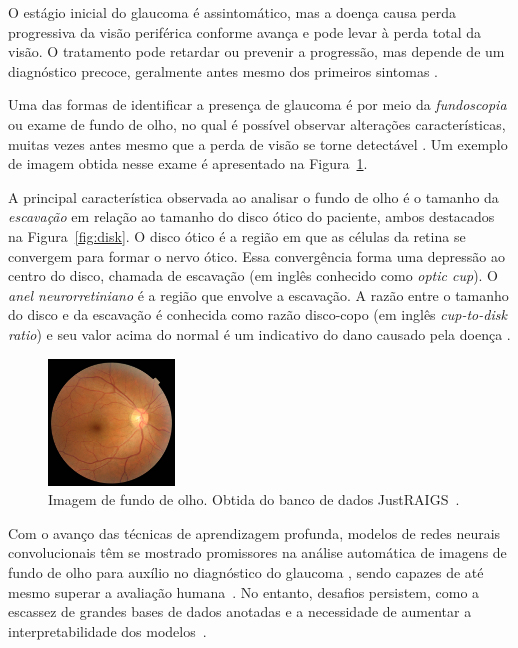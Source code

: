 \documentclass[12pt]{article}
\begin{document}
O estágio inicial do glaucoma é assintomático, mas a doença causa perda progressiva da visão periférica conforme avança e pode levar à perda total da visão. O tratamento pode retardar ou prevenir a progressão, mas depende de um diagnóstico precoce, geralmente antes mesmo dos primeiros sintomas \cite{who_2019}.

Uma das formas de identificar a presença de glaucoma é por meio da \emph{fundoscopia} ou exame de fundo de olho, no qual é possível observar alterações características, muitas vezes antes mesmo que a perda de visão se torne detectável \cite{weinreb_2004}. Um exemplo de imagem obtida nesse exame é apresentado na Figura~\ref{fig:fundus}.

A principal característica observada ao analisar o fundo de olho é o tamanho da \emph{escavação} em relação ao tamanho do disco ótico do paciente, ambos destacados na Figura~\ref{fig:disk}. O disco ótico é a região em que as células da retina se convergem para formar o nervo ótico. Essa convergência forma uma depressão ao centro do disco, chamada de escavação (em inglês conhecido como \emph{optic cup}). O \emph{anel neurorretiniano} é a região que envolve a escavação. A razão entre o tamanho do disco e da escavação é conhecida como razão disco-copo (em inglês \emph{cup-to-disk ratio}) e seu valor acima do normal é um indicativo do dano causado pela doença \cite{weinreb_2004}. %

\begin{figure}[htb]
 \centering
 \includegraphics[width=0.3\textwidth]{images/TRAIN000004_cut.JPG}
 \caption{Imagem de fundo de olho. Obtida do banco de dados JustRAIGS~\cite{justraigs}.}
 \label{fig:fundus}
\end{figure}


Com o avanço das técnicas de aprendizagem profunda, modelos de redes neurais convolucionais têm se mostrado promissores na análise automática de imagens de fundo de olho para auxílio no diagnóstico do glaucoma \cite{li_review_2021}, sendo capazes de até mesmo superar a avaliação humana~\cite{tan_glaucoma_2020}. No entanto, desafios persistem, como a escassez de grandes bases de dados anotadas e a necessidade de aumentar a interpretabilidade dos modelos~\cite{li_review_2021}.
\end{document}
